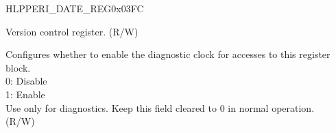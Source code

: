 \begin{register}{H}{LPPERI\_DATE\_REG}{0x03FC}\label{regdesc:LPPERIDATEREG}
%
%
\regnewline%
\begin{regdesc}\begin{reglist}
\label{fielddesc:LPPERILPPERIDATE}\item [LPPERI\_LPPERI\_DATE] Version control register. (R/W)
\label{fielddesc:LPPERICLKEN}\item [LPPERI\_CLK\_EN] Configures whether to enable the diagnostic clock for accesses to this register block.\\
0: Disable\\
1: Enable\\
Use only for diagnostics. Keep this field cleared to 0 in normal operation.\\
(R/W)
\end{reglist}\end{regdesc}
\end{register}

